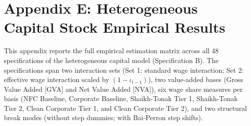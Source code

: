 \FloatBarrier
\section{Appendix E: Heterogeneous Capital Stock Empirical Results}
\label{app:specB_full_results}

This appendix reports the full empirical estimation matrix across all 48 specifications of the heterogeneous capital model (Specification B). The specifications span two interaction sets (Set 1: standard wage interaction; Set 2: effective wage interaction scaled by $(1-\iota_{t-1})$), two value-added bases (Gross Value Added [GVA] and Net Value Added [NVA]), six wage share measures per basis (NFC Baseline, Corporate Baseline, Shaikh-Tonak Tier 1, Shaikh-Tonak Tier 2, Clean Corporate Tier 1, and Clean Corporate Tier 2), and two structural break modes (without step dummies; with Bai-Perron step shifts).

